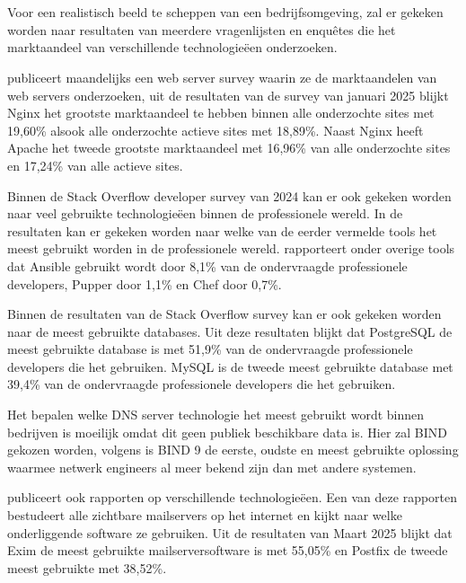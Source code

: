 \section{}%
\label{sec:Infrastructuur studie}

Voor een realistisch beeld te scheppen van een bedrijfsomgeving, zal er gekeken worden naar resultaten van meerdere vragenlijsten en enquêtes die het marktaandeel van verschillende technologieëen onderzoeken. \break

\textcite{NetcraftSurvey} publiceert maandelijks een web server survey waarin ze de marktaandelen van web servers onderzoeken, uit de resultaten van de survey van januari 2025 blijkt Nginx het grootste marktaandeel te hebben binnen alle onderzochte sites met 19,60\% alsook alle onderzochte actieve sites met 18,89\%.
Naast Nginx heeft Apache het tweede grootste marktaandeel met 16,96\% van alle onderzochte sites en 17,24\% van alle actieve sites. \break

Binnen de Stack Overflow developer survey van 2024 kan er ook gekeken worden naar veel gebruikte technologieëen binnen de professionele wereld.
In de resultaten kan er gekeken worden naar welke van de eerder vermelde tools het meest gebruikt worden in de professionele wereld. \autocite{StackOverflowSurvey} rapporteert onder overige tools dat Ansible gebruikt wordt door 8,1\% van de ondervraagde professionele developers, Pupper door 1,1\% en Chef door 0,7\%. \break

Binnen de resultaten van de Stack Overflow survey kan er ook gekeken worden naar de meest gebruikte databases. Uit deze resultaten blijkt dat PostgreSQL de meest gebruikte database is met 51,9\% van de ondervraagde professionele developers die het gebruiken. MySQL is de tweede meest gebruikte database met 39,4\% van de ondervraagde professionele developers die het gebruiken. \autocite{StackOverflowSurvey} \break

Het bepalen welke DNS server technologie het meest gebruikt wordt binnen bedrijven is moeilijk omdat dit geen publiek beschikbare data is. Hier zal BIND gekozen worden, volgens \textcite{Bind9} is BIND 9 de eerste, oudste en meest gebruikte oplossing waarmee netwerk engineers al meer bekend zijn dan met andere systemen. \break

\textcite{SecSpMail} publiceert ook rapporten op verschillende technologieëen. Een van deze rapporten bestudeert alle zichtbare mailservers op het internet en kijkt naar welke onderliggende software ze gebruiken. Uit de resultaten van Maart 2025 blijkt dat Exim de meest gebruikte mailserversoftware is met 55,05\% en Postfix de tweede meest gebruikte met 38,52\%. \break

